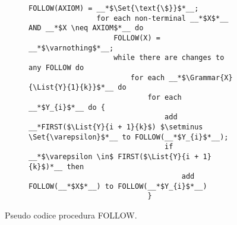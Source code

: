 \documentclass{subfiles}
\begin{document}
\begin{figure}[h!]
    \centering
    \begin{subfigure}[b]{0.7125\textwidth}
        \begin{lstlisting}[language = PSEUDO]
                FOLLOW(AXIOM) = __*$\Set{\text{\$}}$*__;
                for each non-terminal __*$X$*__ AND __*$X \neq AXIOM$*__ do 
                    FOLLOW(X) = __*$\varnothing$*__;
                    while there are changes to any FOLLOW do 
                        for each __*$\Grammar{X}{\List{Y}{1}{k}}$*__ do 
                            for each __*$Y_{i}$*__ do {
                                add __*FIRST($\List{Y}{i + 1}{k}$) $\setminus \Set{\varepsilon}$*__ to FOLLOW(__*$Y_{i}$*__);
                                if __*$\varepsilon \in$ FIRST($\List{Y}{i + 1}{k}$)*__ then
                                    add FOLLOW(__*$X$*__) to FOLLOW(__*$Y_{i}$*__)
                            }
            \end{lstlisting}
    \end{subfigure}
    \caption{Pseudo codice procedura FOLLOW.}
    \label{fig:4}
\end{figure}
\end{document}

